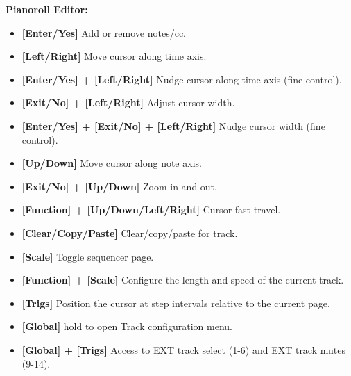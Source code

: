 \textbf{Pianoroll Editor:}
\begin{itemize}
     \item \textbf{[Enter/Yes]} Add or remove notes/cc.
     \item \textbf{[Left/Right]} Move cursor along time axis.
     \item \textbf{[Enter/Yes] + [Left/Right]} Nudge cursor along time axis (fine control).
     \item \textbf{[Exit/No] + [Left/Right]} Adjust cursor width.
     \item \textbf{[Enter/Yes] + [Exit/No] + [Left/Right]} Nudge cursor width (fine control).
     \item \textbf{[Up/Down]} Move cursor along note axis.
     \item \textbf{[Exit/No] + [Up/Down]} Zoom in and out.
     \item \textbf{[Function] + [Up/Down/Left/Right]} Cursor fast travel.
     \item \textbf{[Clear/Copy/Paste]} Clear/copy/paste for track.
     \item \textbf{[Scale]} Toggle sequencer page.
     \item \textbf{[Function] + [Scale]} Configure the length and speed of the current track.
     \item \textbf{[Trigs]} Position the cursor at step intervals relative to the current page.
\item \textbf{[Global]} hold to open Track configuration menu.
\item \textbf{[Global] + [Trigs]} Access to EXT track select (1-6) and EXT track mutes (9-14).
\end{itemize}

